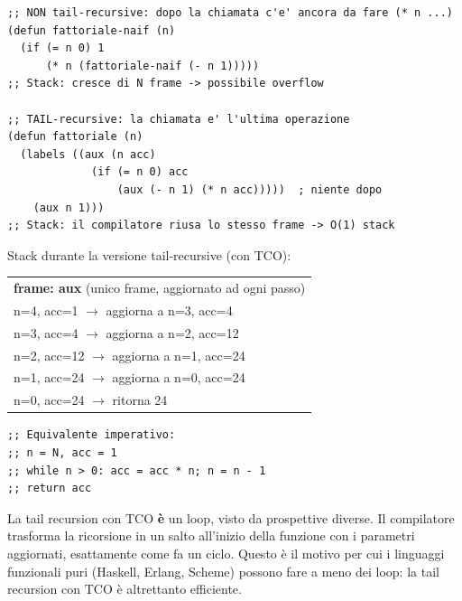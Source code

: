 \begin{esempio}
\begin{lstlisting}
;; NON tail-recursive: dopo la chiamata c'e' ancora da fare (* n ...)
(defun fattoriale-naif (n)
  (if (= n 0) 1
      (* n (fattoriale-naif (- n 1)))))
;; Stack: cresce di N frame -> possibile overflow

;; TAIL-recursive: la chiamata e' l'ultima operazione
(defun fattoriale (n)
  (labels ((aux (n acc)
             (if (= n 0) acc
                 (aux (- n 1) (* n acc)))))  ; niente dopo
    (aux n 1)))
;; Stack: il compilatore riusa lo stesso frame -> O(1) stack
\end{lstlisting}

Stack durante la versione tail-recursive (con TCO):

\begin{tcolorbox}[
  enhanced, colback=black!3, colframe=black!25,
  arc=2pt, boxrule=0.4pt,
  left=10pt, right=10pt, top=8pt, bottom=8pt,
  before skip=6pt, after skip=6pt
]
\ttfamily\small
\begin{tabular}{|l|}
\hline
\textbf{frame: aux} \quad(unico frame, aggiornato ad ogni passo) \\
\quad n=4, acc=1   $\to$ aggiorna a n=3, acc=4 \\
\quad n=3, acc=4   $\to$ aggiorna a n=2, acc=12 \\
\quad n=2, acc=12  $\to$ aggiorna a n=1, acc=24 \\
\quad n=1, acc=24  $\to$ aggiorna a n=0, acc=24 \\
\quad n=0, acc=24  $\to$ ritorna 24 \\
\hline
\end{tabular}
\end{tcolorbox}


\begin{lstlisting}
;; Equivalente imperativo:
;; n = N, acc = 1
;; while n > 0: acc = acc * n; n = n - 1
;; return acc
\end{lstlisting}
\end{esempio}

\begin{intuizione}
La tail recursion con TCO \textbf{è} un loop, visto da prospettive diverse.
Il compilatore trasforma la ricorsione in un salto all'inizio della
funzione con i parametri aggiornati, esattamente come fa un ciclo.
Questo è il motivo per cui i linguaggi funzionali puri (Haskell, Erlang,
Scheme) possono fare a meno dei loop: la tail recursion con TCO è
altrettanto efficiente.
\end{intuizione}

